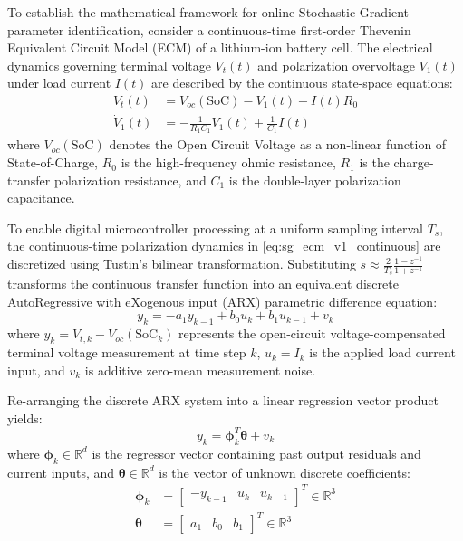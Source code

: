 To establish the mathematical framework for online Stochastic Gradient parameter identification, consider a continuous-time first-order Thevenin Equivalent Circuit Model (ECM) of a lithium-ion battery cell. The electrical dynamics governing terminal voltage $V_t(t)$ and polarization overvoltage $V_1(t)$ under load current $I(t)$ are described by the continuous state-space equations:
\begin{align}
V_t(t) &= V_{oc}(\text{SoC}) - V_1(t) - I(t) R_0 \label{eq:sg_ecm_vt_continuous} \\
\dot{V}_1(t) &= -\frac{1}{R_1 C_1} V_1(t) + \frac{1}{C_1} I(t) \label{eq:sg_ecm_v1_continuous}
\end{align}
where $V_{oc}(\text{SoC})$ denotes the Open Circuit Voltage as a non-linear function of State-of-Charge, $R_0$ is the high-frequency ohmic resistance, $R_1$ is the charge-transfer polarization resistance, and $C_1$ is the double-layer polarization capacitance.

To enable digital microcontroller processing at a uniform sampling interval $T_s$, the continuous-time polarization dynamics in \eqref{eq:sg_ecm_v1_continuous} are discretized using Tustin's bilinear transformation. Substituting $s \approx \frac{2}{T_s} \frac{1 - z^{-1}}{1 + z^{-1}}$ transforms the continuous transfer function into an equivalent discrete AutoRegressive with eXogenous input (ARX) parametric difference equation:
\begin{equation}
y_k = -a_1 y_{k-1} + b_0 u_k + b_1 u_{k-1} + v_k
\label{eq:sg_arx_difference}
\end{equation}
where $y_k = V_{t,k} - V_{oc}(\text{SoC}_k)$ represents the open-circuit voltage-compensated terminal voltage measurement at time step $k$, $u_k = I_k$ is the applied load current input, and $v_k$ is additive zero-mean measurement noise.

Re-arranging the discrete ARX system into a linear regression vector product yields:
\begin{equation}
y_k = \boldsymbol{\phi}_k^T \boldsymbol{\theta} + v_k
\label{eq:sg_linear_regression}
\end{equation}
where $\boldsymbol{\phi}_k \in \mathbb{R}^d$ is the regressor vector containing past output residuals and current inputs, and $\boldsymbol{\theta} \in \mathbb{R}^d$ is the vector of unknown discrete coefficients:
\begin{align}
\boldsymbol{\phi}_k &= \begin{bmatrix} -y_{k-1} & u_k & u_{k-1} \end{bmatrix}^T \in \mathbb{R}^3 \label{eq:sg_regressor_def} \\
\boldsymbol{\theta} &= \begin{bmatrix} a_1 & b_0 & b_1 \end{bmatrix}^T \in \mathbb{R}^3 \label{eq:sg_theta_def}
\end{align}

